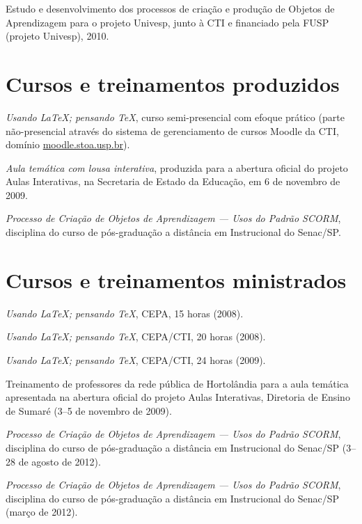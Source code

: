 \begin{compactitem}
	\item Estudo e desenvolvimento dos processos de criação e produção de Objetos de Aprendizagem para o projeto Univesp, junto à CTI e financiado pela FUSP (projeto Univesp), 2010.
\end{compactitem}

\section*{Cursos e treinamentos produzidos}

\begin{compactitem}
	\item \textsl{Usando \LaTeX; pensando \TeX}, curso semi-presencial com efoque prático (parte não-presencial através do sistema de gerenciamento de cursos Moodle da CTI, domínio \url{moodle.stoa.usp.br}).
	\item \textsl{Aula temática com lousa interativa}, produzida para a abertura oficial do projeto Aulas Interativas, na Secretaria de Estado da Educação, em 6 de novembro de 2009.
	\item \textsl{Processo de Criação de Objetos de Aprendizagem --- Usos do Padrão SCORM}, disciplina do curso de pós-graduação a distância em  Instrucional do Senac/SP.
\end{compactitem}

\section*{Cursos e treinamentos ministrados}

\begin{compactitem}
	\item \textsl{Usando \LaTeX; pensando \TeX}, CEPA, 15 horas (2008).
	\item \textsl{Usando \LaTeX; pensando \TeX}, CEPA/CTI, 20 horas (2008).
	\item \textsl{Usando \LaTeX; pensando \TeX}, CEPA/CTI, 24 horas (2009).
	\item Treinamento de professores da rede pública de Hortolândia para a aula temática apresentada na abertura oficial do projeto Aulas Interativas, Diretoria de Ensino de Sumaré (3--5 de novembro de 2009).
	\item \textsl{Processo de Criação de Objetos de Aprendizagem --- Usos do Padrão SCORM}, disciplina do curso de pós-graduação a distância em  Instrucional do Senac/SP (3--28 de agosto de 2012).
	\item \textsl{Processo de Criação de Objetos de Aprendizagem --- Usos do Padrão SCORM}, disciplina do curso de pós-graduação a distância em  Instrucional do Senac/SP (março de 2012).
\end{compactitem}

